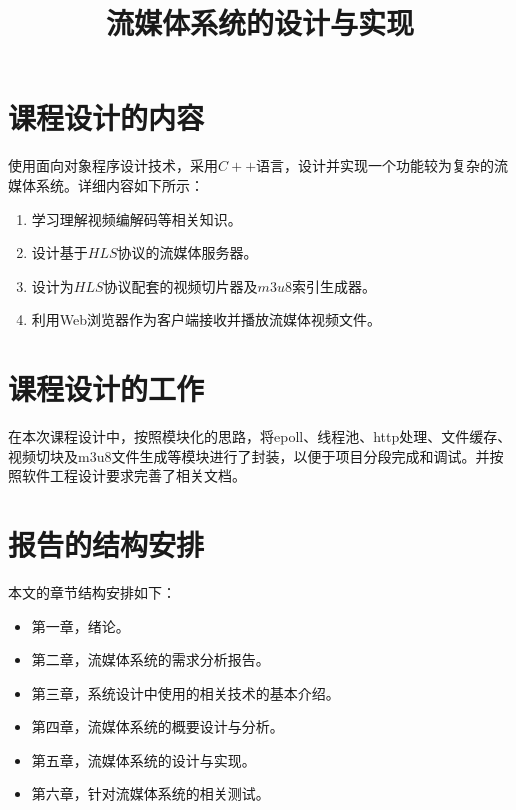 \documentclass[bachelor]{thesis-uestc}
\title{流媒体系统的设计与实现}
\author{}
\begin{document}
\begin{chineseabstract}


\chinesekeyword{}
\end{chineseabstract}

\thesistableofcontents

\thesischapterexordium

\section{课程设计的内容}

使用面向对象程序设计技术，采用$C++$语言，设计并实现一个功能较为复杂的流媒体系统。详细内容如下所示：

\begin{enumerate}
	\item 学习理解视频编解码等相关知识。
	\item 设计基于$HLS$协议的流媒体服务器。
	\item 设计为$HLS$协议配套的视频切片器及$m3u8$索引生成器。
	\item 利用Web浏览器作为客户端接收并播放流媒体视频文件。

\end{enumerate}


\section{课程设计的工作}

在本次课程设计中，按照模块化的思路，将epoll、线程池、http处理、文件缓存、视频切块及m3u8文件生成等模块进行了封装，以便于项目分段完成和调试。并按照软件工程设计要求完善了相关文档。

\section{报告的结构安排}
本文的章节结构安排如下：

\begin{itemize}
	\item 第一章，绪论。
 	\item 第二章，流媒体系统的需求分析报告。
	\item 第三章，系统设计中使用的相关技术的基本介绍。
	\item 第四章，流媒体系统的概要设计与分析。
	\item 第五章，流媒体系统的设计与实现。
	\item 第六章，针对流媒体系统的相关测试。
\end{itemize}
\end{document}
